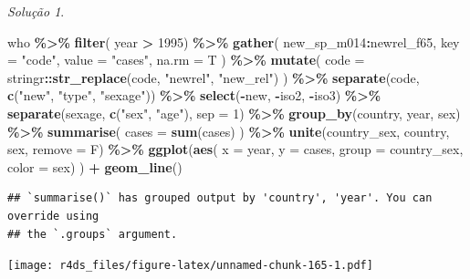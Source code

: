 \documentclass[
]{latex/krantz}
\newenvironment{Shaded}{\begin{snugshade}}{\end{snugshade}}
\newcommand{\AttributeTok}[1]{\textcolor[rgb]{0.13,0.29,0.53}{#1}}
\newcommand{\DecValTok}[1]{\textcolor[rgb]{0.00,0.00,0.81}{#1}}
\newcommand{\FunctionTok}[1]{\textcolor[rgb]{0.13,0.29,0.53}{\textbf{#1}}}
\newcommand{\NormalTok}[1]{#1}
\newcommand{\SpecialCharTok}[1]{\textcolor[rgb]{0.81,0.36,0.00}{\textbf{#1}}}
\newcommand{\StringTok}[1]{\textcolor[rgb]{0.31,0.60,0.02}{#1}}
\theoremstyle{definition}
\theoremstyle{definition}
\theoremstyle{definition}
\theoremstyle{definition}
\theoremstyle{remark}
\newtheorem*{solution}{Solução}
\begin{document}
\begin{solution}
\leavevmode

\begin{Shaded}
\begin{Highlighting}[]
\NormalTok{who }\SpecialCharTok{\%\textgreater{}\%}
  \FunctionTok{filter}\NormalTok{( year }\SpecialCharTok{\textgreater{}} \DecValTok{1995}\NormalTok{) }\SpecialCharTok{\%\textgreater{}\%}
  \FunctionTok{gather}\NormalTok{(}
\NormalTok{    new\_sp\_m014}\SpecialCharTok{:}\NormalTok{newrel\_f65, }
    \AttributeTok{key =} \StringTok{"code"}\NormalTok{,}
    \AttributeTok{value =} \StringTok{"cases"}\NormalTok{,}
    \AttributeTok{na.rm =}\NormalTok{ T}
\NormalTok{  ) }\SpecialCharTok{\%\textgreater{}\%}
  \FunctionTok{mutate}\NormalTok{(}
    \AttributeTok{code =}\NormalTok{ stringr}\SpecialCharTok{::}\FunctionTok{str\_replace}\NormalTok{(code, }\StringTok{"newrel"}\NormalTok{, }\StringTok{"new\_rel"}\NormalTok{)}
\NormalTok{  ) }\SpecialCharTok{\%\textgreater{}\%}
  \FunctionTok{separate}\NormalTok{(code, }\FunctionTok{c}\NormalTok{(}\StringTok{"new"}\NormalTok{, }\StringTok{"type"}\NormalTok{, }\StringTok{"sexage"}\NormalTok{)) }\SpecialCharTok{\%\textgreater{}\%}
  \FunctionTok{select}\NormalTok{(}\SpecialCharTok{{-}}\NormalTok{new, }\SpecialCharTok{{-}}\NormalTok{iso2, }\SpecialCharTok{{-}}\NormalTok{iso3) }\SpecialCharTok{\%\textgreater{}\%}
  \FunctionTok{separate}\NormalTok{(sexage, }\FunctionTok{c}\NormalTok{(}\StringTok{"sex"}\NormalTok{, }\StringTok{"age"}\NormalTok{), }\AttributeTok{sep =} \DecValTok{1}\NormalTok{) }\SpecialCharTok{\%\textgreater{}\%}
  \FunctionTok{group\_by}\NormalTok{(country, year, sex) }\SpecialCharTok{\%\textgreater{}\%}
  \FunctionTok{summarise}\NormalTok{(}
    \AttributeTok{cases =} \FunctionTok{sum}\NormalTok{(cases)}
\NormalTok{  ) }\SpecialCharTok{\%\textgreater{}\%}
  \FunctionTok{unite}\NormalTok{(country\_sex, country, sex, }\AttributeTok{remove =}\NormalTok{ F) }\SpecialCharTok{\%\textgreater{}\%}
  \FunctionTok{ggplot}\NormalTok{(}\FunctionTok{aes}\NormalTok{(}
    \AttributeTok{x =}\NormalTok{ year, }
    \AttributeTok{y =}\NormalTok{ cases, }
    \AttributeTok{group =}\NormalTok{ country\_sex,}
    \AttributeTok{color =}\NormalTok{ sex)}
\NormalTok{  ) }\SpecialCharTok{+}
    \FunctionTok{geom\_line}\NormalTok{()}
\end{Highlighting}
\end{Shaded}

\begin{verbatim}
## `summarise()` has grouped output by 'country', 'year'. You can override using
## the `.groups` argument.
\end{verbatim}

\texttt{[image: r4ds\_files/figure-latex/unnamed-chunk-165-1.pdf]}

\end{solution}
\end{document}
